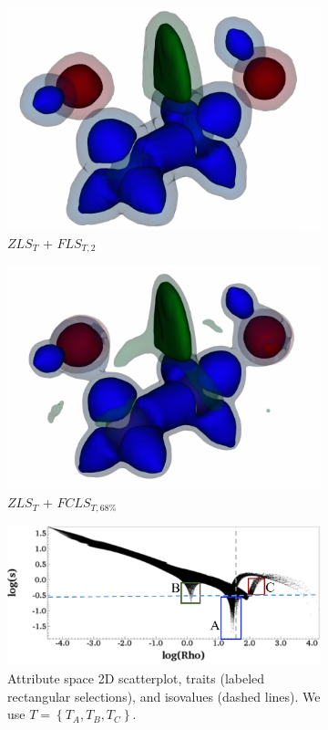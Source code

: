 \begin{figure}[h]
\begin{subfigure}{0.18\linewidth}
\includegraphics[width=\linewidth]{Images/EthaneDiol/fls_2_3.pdf}
\caption{$ZLS_{T}$ + $FLS_{T,2}$}
\label{}
\end{subfigure}
\begin{subfigure}{0.18\linewidth}
\centering
\includegraphics[width=\linewidth]{Images/EthaneDiol/fcls_68_3.pdf}
\caption{$ZLS_{T}$ + $FCLS_{T,68\%}$}
\label{}
\end{subfigure}
\begin{subfigure}{0.24\linewidth}
\centering
\includegraphics[width=\linewidth]{Images/EthaneDiol/scatterplot_3.pdf}
\caption{Attribute space 2D scatterplot, traits (labeled rectangular selections), and isovalues (dashed lines). We use $T = \left\{T_{A}, T_{B}, T_{C}\right\}$.} 
\label{}
\end{subfigure}
\caption{}
\label{}
\end{figure}
